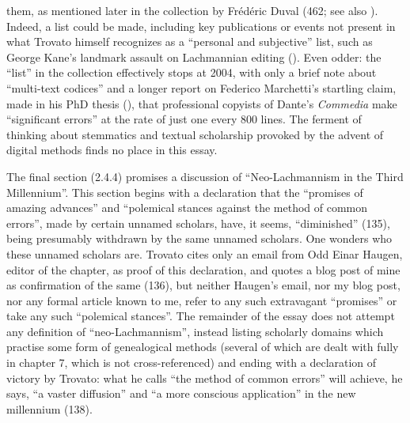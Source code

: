 \begin{review}
them, as mentioned later in the collection by Frédéric Duval (462; see
also \cite{pugliatti_textual_1998}). Indeed, a list could be made, including key
publications or events not present in what Trovato himself recognizes as
a ``personal and subjective'' list, such as George Kane's landmark
assault on Lachmannian editing (\citeyear{kane_john_1984}). Even odder: the ``list'' in the
collection effectively stops at 2004, with only a brief note about
``multi-text codices'' and a longer report on Federico Marchetti's
startling claim, made in his PhD thesis (\citeyear{marchetti_scribal_2019}), that professional
copyists of Dante's \emph{Commedia} make ``significant errors'' at the
rate of just one every 800 lines. The ferment of thinking about
stemmatics and textual scholarship provoked by the advent of digital
methods finds no place in this essay.

The final section (2.4.4) promises a discussion of
``Neo-Lachmannism in the Third Millennium''. This section begins with a
declaration that the ``promises of amazing advances'' and ``polemical
stances against the method of common errors'', made by certain unnamed
scholars, have, it seems, ``diminished'' (135), being presumably
withdrawn by the same unnamed scholars. One wonders who these unnamed
scholars are. Trovato cites only an email from Odd Einar Haugen, editor
of the chapter, as proof of this declaration, and quotes a blog post of
mine as confirmation of the same (136), but neither Haugen's email, nor
my blog post, nor any formal article known to me, refer to any such
extravagant ``promises'' or take any such ``polemical stances''. The
remainder of the essay does not attempt any definition of
``neo-Lachmannism'', instead listing scholarly domains which practise
some form of genealogical methods (several of which are dealt with fully
in chapter 7, which is not cross-referenced) and ending with a
declaration of victory by Trovato: what he calls ``the method of common
errors'' will achieve, he says, ``a vaster diffusion'' and ``a more
conscious application'' in the new millennium (138).


\end{review}
